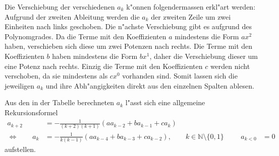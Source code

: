 Die Verschiebung der verschiedenen $a_k$ k"onnen folgendermassen erkl"art 
werden: Aufgrund der zweiten Ableitung werden die $a_k$ der zweiten Zeile um 
zwei Einheiten nach links geschoben. Die n"achste Verschiebung gibt es aufgrund 
des Polynomgrades. Da die Terme mit den Koeffizienten $a$ mindestens die Form 
$ax^2$ haben, verschieben sich diese um zwei Potenzen nach rechts. Die Terme 
mit den Koeffizienten $b$ haben mindestens die Form $bx^1$, daher die 
Verschiebung dieser um eine Potenz nach rechts. Einzig die Terme mit den 
Koeffizienten $c$ werden nicht verschoben, da sie mindestens als $cx^0$ 
vorhanden sind. Somit lassen sich die jeweiligen $a_k$ und ihre Abh"angigkeiten 
direkt aus den einzelnen Spalten ablesen.

Aus den in der Tabelle berechneten $a_k$ l"asst sich eine allgemeine 
Rekursionsformel
%
\begin{align*}
	a_{k+2} &= -\frac{1}{(k+2)(k+1)} (aa_{k-2}+ba_{k-1}+ca_k) \\
	\Leftrightarrow \qquad
	a_k &= -\frac{1}{k(k-1)} (aa_{k-4}+ba_{k-3}+ca_{k-2}), \qquad k \in 
	\mathbb{N} \setminus \{0, 1\}
	&&&a_{k<0} &= 0
\end{align*}
aufstellen.
